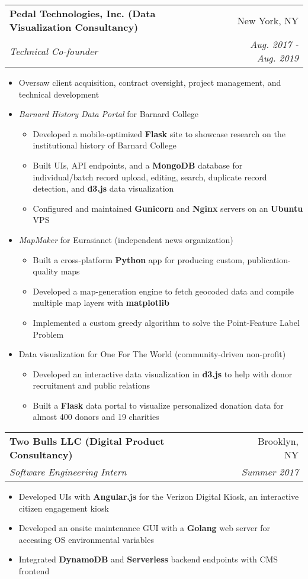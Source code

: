 \documentclass[letterpaper,11pt]{article}
\makeatletter
\newcommand{\resumeItemNoTitle}[1]{\item\small #1 \vspace{-2pt}}
\newcommand{\resumeSubheading}[4]{
  \vspace{-1pt}\item
    \begin{tabular*}{0.97\textwidth}[t]{l@{\extracolsep{\fill}}r}
      \textbf{#1} & #2 \\
      \textit{\small#3} & \textit{\small #4} \\
    \end{tabular*}\vspace{-5pt}
}
\newcommand{\resumeItemListStart}{\begin{itemize}}
\newcommand{\resumeListEnd}{\end{itemize}}
\makeatother
\begin{document}
    \resumeSubheading
      {Pedal Technologies, Inc. (Data Visualization Consultancy)}{New York, NY}
      {Technical Co-founder}{Aug. 2017 - Aug. 2019}
    \resumeItemListStart
      \resumeItemNoTitle {Oversaw client acquisition, contract oversight, project management, and technical development}
      \resumeItemNoTitle {\textit{Barnard History Data Portal} for Barnard College}
        \resumeItemListStart
          \resumeItemNoTitle {Developed a mobile-optimized \textbf{Flask} site to showcase research on the institutional history of Barnard College}
          \resumeItemNoTitle {Built UIs, API endpoints, and a \textbf{MongoDB} database for individual/batch record upload, editing, search, duplicate record detection, and \textbf{d3.js} data visualization}
          \resumeItemNoTitle {Configured and maintained \textbf{Gunicorn} and \textbf{Nginx} servers on an \textbf{Ubuntu} VPS}
        \end{itemize}
      \resumeItemNoTitle {\textit{MapMaker} for Eurasianet (independent news organization)}
        \resumeItemListStart
          \resumeItemNoTitle {Built a cross-platform \textbf{Python} app for producing custom, publication-quality maps}
          \resumeItemNoTitle {Developed a map-generation engine to fetch geocoded data and compile multiple map layers with \textbf{matplotlib} }
          \resumeItemNoTitle {Implemented a custom greedy algorithm to solve the Point-Feature Label Problem}
        \end{itemize}
      \resumeItemNoTitle {Data visualization for One For The World (community-driven non-profit)}
        \resumeItemListStart
          \resumeItemNoTitle {Developed an interactive data visualization in \textbf{d3.js} to help with donor recruitment and public relations}
          \resumeItemNoTitle {Built a \textbf{Flask} data portal to visualize personalized donation data for almost 400 donors and 19 charities}
        \resumeListEnd
    \resumeListEnd

    \resumeSubheading
      {Two Bulls LLC (Digital Product Consultancy)}{Brooklyn, NY}
      {Software Engineering Intern}{Summer 2017}
      \resumeItemListStart
        \resumeItemNoTitle {Developed UIs with \textbf{Angular.js} for the Verizon Digital Kiosk, an interactive citizen engagement kiosk}
        \resumeItemNoTitle {Developed an onsite maintenance GUI with a \textbf{Golang} web server for accessing OS environmental variables}
        \resumeItemNoTitle {Integrated \textbf{DynamoDB} and \textbf{Serverless} backend endpoints with CMS frontend}
      \resumeListEnd
\end{document}
